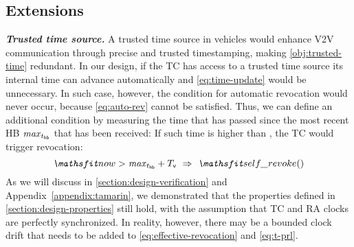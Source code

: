 \subsection{Extensions}
\label{section:design-extensions}

\noindent\textbf{\emph{Trusted time source.}}
%
A trusted time source in vehicles would enhance \ac{V2V} communication through
precise and trusted timestamping, making \ref{obj:trusted-time} redundant. In
our design, if the \ac{TC} has access to a trusted time source its internal time
can advance automatically and \cref{eq:time-update} would be unnecessary. In
such case, however, the condition for automatic revocation would never occur,
because \cref{eq:auto-rev} cannot be satisfied. Thus, we can define an
additional condition by measuring the time that has passed since the most recent
\ac{HB} $\mathit{max}_{\emph{$t_{\mathsf{hb}}$}{}}$ that has been received: If such time is
higher than \paramtt, the \ac{TC} would trigger revocation:
%
\begin{equation}
    \label{eq:auto-rev-timeout}
    \funcnow{} > \mathit{max}_{\paramthb{}} + \paramtt{} \ \Rightarrow\  \funcselfrevoke{}
\end{equation}
%
As we will discuss in \cref{section:design-verification} and
Appendix~\ref{appendix:tamarin}, we demonstrated that the properties defined in
\cref{section:design-properties} still hold, with the assumption that \ac{TC}
and \ac{RA} clocks are perfectly synchronized. In reality, however, there may be
a bounded clock drift \paramtd{} that needs to be added to
\cref{eq:effective-revocation} and \cref{eq:t-prl}. 

